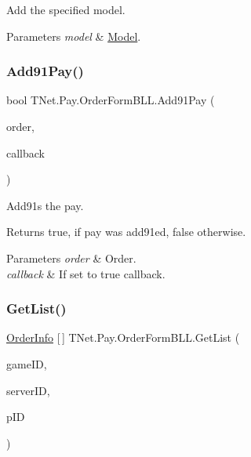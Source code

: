 Add the specified model. 


\begin{DoxyParams}{Parameters}
{\em model} & \mbox{\hyperlink{namespace_t_net_1_1_model}{Model}}.\\
\hline
\end{DoxyParams}
\mbox{\label{class_t_net_1_1_pay_1_1_order_form_b_l_l_ad5797704f79a99f6162a4f260369a8b1}} 
\subsubsection{\texorpdfstring{Add91\+Pay()}{Add91Pay()}}
{\footnotesize\ttfamily bool T\+Net.\+Pay.\+Order\+Form\+B\+L\+L.\+Add91\+Pay (\begin{DoxyParamCaption}\item[{\mbox{\hyperlink{class_t_net_1_1_pay_1_1_order_info}{Order\+Info}}}]{order,  }\item[{bool}]{callback }\end{DoxyParamCaption})}



Add91s the pay. 

\begin{DoxyReturn}{Returns}
{\ttfamily true}, if pay was add91ed, {\ttfamily false} otherwise.
\end{DoxyReturn}

\begin{DoxyParams}{Parameters}
{\em order} & Order.\\
\hline
{\em callback} & If set to {\ttfamily true} callback.\\
\hline
\end{DoxyParams}
\mbox{\label{class_t_net_1_1_pay_1_1_order_form_b_l_l_adef57874b4407e561135d60c130a04cb}} 
\subsubsection{\texorpdfstring{Get\+List()}{GetList()}}
{\footnotesize\ttfamily \mbox{\hyperlink{class_t_net_1_1_pay_1_1_order_info}{Order\+Info}} \mbox{[}$\,$\mbox{]} T\+Net.\+Pay.\+Order\+Form\+B\+L\+L.\+Get\+List (\begin{DoxyParamCaption}\item[{int}]{game\+ID,  }\item[{int}]{server\+ID,  }\item[{string}]{p\+ID }\end{DoxyParamCaption})}



